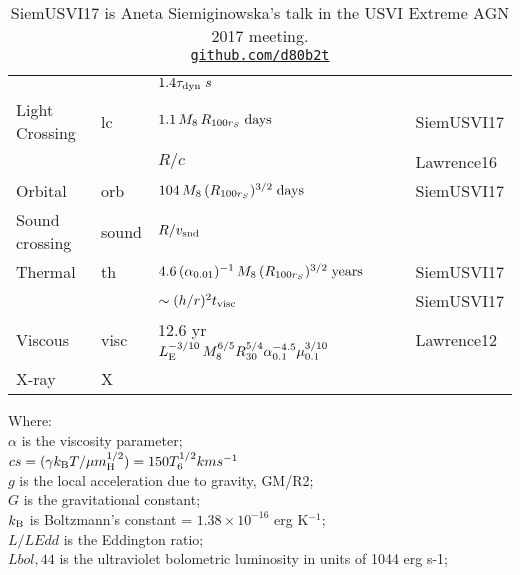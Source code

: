\documentclass[11pt]{article}
\begin{document}
\begin{table}
\begin{center}
\begin{tabular}{l l l l l l}
                                  &            & $1.4 \tau_{\rm dyn} \; s $                                 & & & \\
      Light Crossing     & lc           &   $1.1 \,  M_{8} \, R_{100 r_{S}}  \; {\rm days}$   &   & & SiemUSVI17\\ 
                                  &               &  $ R / c$                                                            &   & & Lawrence16 \\ 
      Orbital                 &  orb    &     $104 \, M_{8} \,  (R_{100r_{S}})^{3/2} \;  {\rm days}$ & & & SiemUSVI17\\ 
      Sound crossing    &  sound  &     $ R / v_{\rm snd} $ & & & \\     
       Thermal               &   th     &    $4.6 \, (\alpha_{0.01})^{-1} \, M_{8}\, (R_{100r_{S}} )^{3/2}  \; {\rm years}$  & & & SiemUSVI17\\ 
                                   &           &   $\sim (h/r)^{2} t_{\rm visc}$                        & & & SiemUSVI17\\ 
      Viscous                 & visc  & 12.6 yr $L_{\rm E}^{-3/10} \, M_8^{6/5} R_{30}^{5/4} \alpha_{0.1}^{-4.5} \mu_{0.1}^{3/10}$  & & & Lawrence12 \\
      X-ray                    & X             &    & & & \\
         \hline
         \hline 
       \end{tabular}
      \caption{SiemUSVI17 is Aneta Siemiginowska's talk in the USVI Extreme AGN 2017 meeting. \\ 
                    \href{https://github.com/d80b2t}{\tt github.com/d80b2t}}
    \end{center}
\end{table}
\noindent
Where:\\
$\alpha$ is the viscosity parameter; \\
$cs = (\gamma k_{\rm B} T/\mu m_{\rm H}^{1/2}) = 150 T_{6}^{1/2} km s^{-1}$ \\
$g$ is the local acceleration due to gravity, GM/R2; \\
$G$ is the gravitational constant; \\
$k_{\rm B}$ is Boltzmann’s constant = $1.38 \times10^{-16}$ erg K$^{-1}$;\\
$L/LEdd$ is the Eddington ratio; \\
$Lbol,44$ is the ultraviolet bolometric luminosity in units of 1044 erg s-1;\\
\end{document}
